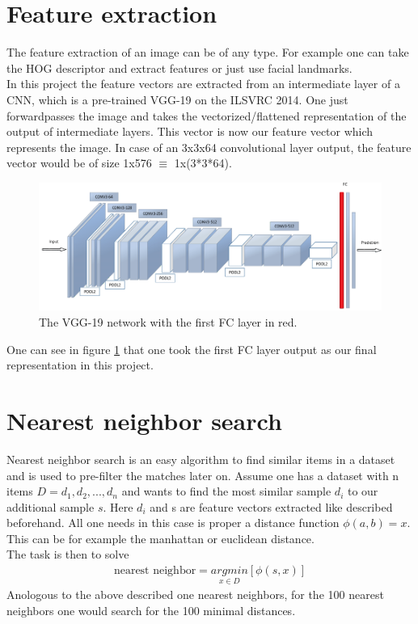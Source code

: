 \documentclass[
     11pt,         %
     a4paper,      %
     oneside,
     ]{article}
\begin{document}
\section{Feature extraction}
The feature extraction of an image can be of any type. For example one can take the HOG descriptor and extract features or just use facial landmarks.\\
In this project the feature vectors are extracted from an intermediate layer of a CNN, which is a pre-trained VGG-19 on the ILSVRC 2014.
One just forwardpasses the image and takes the vectorized/flattened representation of the output of intermediate layers.
This vector is now our feature vector which represents the image. In case of an 3x3x64 convolutional layer output, the feature vector would be of size 1x576 $\equiv$ 1x(3*3*64).\\
\begin{figure}[H]
  \begin{center}
    \includegraphics[width=1.0\textwidth]{images/VGG19.png}
    \caption{The VGG-19 network with the first FC layer in red.\cite{VGG19}}
    \label{fig:VGG19}
  \end{center}
\end{figure}
One can see in figure \ref{fig:VGG19} that one took the first FC layer output as our final representation in this project.

\section{Nearest neighbor search}
Nearest neighbor search is an easy algorithm to find similar items in a dataset and is used to pre-filter the matches later on. Assume one has a dataset with n items $D = {d_1, d_2, ..., d_n}$ and wants to find the most similar sample $d_i$ to our additional sample $s$. Here $d_i$ and s are feature vectors extracted like described beforehand. All one needs in this case is proper a distance function $\phi(a,b) = x$. This can be for example the manhattan or euclidean distance. \\
The task is then to solve
\begin{align*}
  \text{nearest neighbor} = \underset{x \in D}{argmin} [\phi(s,x)]
\end{align*}
Anologous to the above described one nearest neighbors, for the 100 nearest neighbors one would search for the 100 minimal distances.
\end{document}
